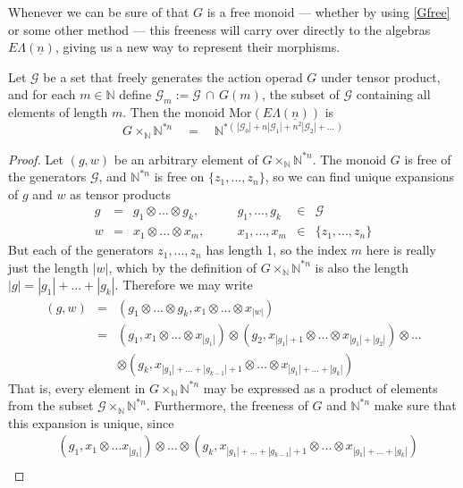 \documentclass{amsbook} %
\newcommand{\ELn}{E\Lambda(\underline{n})}
\numberwithin{section}{chapter}
\begin{document}
Whenever we can be sure of that $G$ is a free monoid --- whether by using \cref{Gfree} or some other method --- this freeness will carry over directly to the algebras $\ELn$, giving us a new way to represent their morphisms.

\begin{prop} \label{freemor} Let $\mathcal{G}$ be a set that freely generates the action operad $G$ under tensor product, and for each $m \in \mathbb{N}$ define $\mathcal{G}_m := \mathcal{G} \, \cap \,  G(m)$, the subset of $\mathcal{G}$ containing all elements of length $m$. Then the monoid $\mathrm{Mor}(\ELn)$ is 
\[ G \times_{\mathbb{N}} \mathbb{N}^{\ast n} \quad = \quad \mathbb{N}^{\ast ( \, |\mathcal{G}_0| + n|\mathcal{G}_1| + n^2 |\mathcal{G}_2| + ... \, )} \]
\end{prop}
\begin{proof}
Let $(g, w)$ be an arbitrary element of $G \times_{\mathbb{N}} \mathbb{N}^{\ast n}$. The monoid $G$ is free of the generators $\mathcal{G}$, and $\mathbb{N}^{\ast n}$ is free on $\{z_1, ..., z_n\}$, so we can find unique expansions of $g$ and $w$ as tensor products
\[ \begin{array}{rclcrcl}
			g & = & g_1 \otimes ... \otimes g_k, & \quad & g_1, ..., g_k & \in & \mathcal{G} \\
			w & = & x_1 \otimes ... \otimes x_m, & \quad & x_1, ..., x_m & \in & \{z_1, ..., z_n\}
		\end{array}
\]
But each of the generators $z_1, ..., z_n$ has length 1, so the index $m$ here is really just the length $|w|$, which by the definition of $G \times_{\mathbb{N}} \mathbb{N}^{\ast n}$ is also the length $|g| = |g_1| + ... + |g_k|$. Therefore we may write
\[ \begin{array}{rll}
			(g, w) & = & (g_1 \otimes ... \otimes g_k, x_1 \otimes ... \otimes x_{|w|}) \\
			& = & (g_1, x_1 \otimes ... \otimes x_{|g_1|}) \otimes (g_2, x_{|g_1|+1} \otimes ... \otimes x_{|g_1|+|g_2|}) \otimes ... \\
			& & \otimes (g_k, x_{|g_1| + ... + |g_{k-1}|+1} \otimes ... \otimes x_{|g_1| + ... + |g_k|})
		\end{array}
\]
That is, every element in $G \times_{\mathbb{N}} \mathbb{N}^{\ast n}$ may be expressed as a product of elements from the subset $\mathcal{G} \times_{\mathbb{N}} \mathbb{N}^{\ast n}$. Furthermore, the freeness of $G$ and $\mathbb{N}^{\ast n}$ make sure that this expansion is unique, since
\[ \begin{array}{rl}
			& (g_1, x_1 \otimes ... x_{|g_1|}) \otimes ... \otimes (g_k, x_{|g_1| + ... + |g_{k-1}|+1} \otimes ... \otimes x_{|g_1| + ... + |g_k|}) \\

\end{array}\]
\end{proof}
\end{document}

